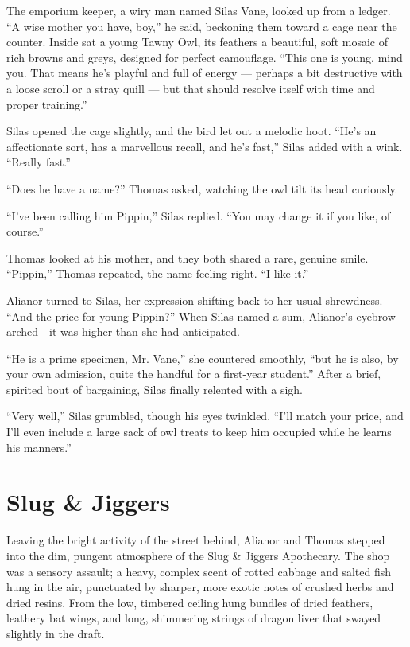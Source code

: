 The emporium keeper, a wiry man named Silas Vane, looked up from a ledger. \enquote{A wise mother you have, boy,} he said, beckoning them toward a cage near the counter. Inside sat a young Tawny Owl, its feathers a beautiful, soft mosaic of rich browns and greys, designed for perfect camouflage. \enquote{This one is young, mind you. That means he's playful and full of energy --- perhaps a bit destructive with a loose scroll or a stray quill --- but that should resolve itself with time and proper training.}

Silas opened the cage slightly, and the bird let out a melodic hoot. \enquote{He's an affectionate sort, has a marvellous recall, and he's fast,} Silas added with a wink. \enquote{Really fast.}

\enquote{Does he have a name?} Thomas asked, watching the owl tilt its head curiously.

\enquote{I've been calling him Pippin,} Silas replied. \enquote{You may change it if you like, of course.}

Thomas looked at his mother, and they both shared a rare, genuine smile. \enquote{Pippin,} Thomas repeated, the name feeling right. \enquote{I like it.}

Alianor turned to Silas, her expression shifting back to her usual shrewdness. \enquote{And the price for young Pippin?} When Silas named a sum, Alianor's eyebrow arched---it was higher than she had anticipated.

\enquote{He is a prime specimen, Mr. Vane,} she countered smoothly, \enquote{but he is also, by your own admission, quite the handful for a first-year student.} After a brief, spirited bout of bargaining, Silas finally relented with a sigh.

\enquote{Very well,} Silas grumbled, though his eyes twinkled. \enquote{I'll match your price, and I'll even include a large sack of owl treats to keep him occupied while he learns his manners.}

\section*{Slug \& Jiggers}

Leaving the bright activity of the street behind, Alianor and Thomas stepped into the dim, pungent atmosphere of the Slug \& Jiggers Apothecary. The shop was a sensory assault; a heavy, complex scent of rotted cabbage and salted fish hung in the air, punctuated by sharper, more exotic notes of crushed herbs and dried resins. From the low, timbered ceiling hung bundles of dried feathers, leathery bat wings, and long, shimmering strings of dragon liver that swayed slightly in the draft.

